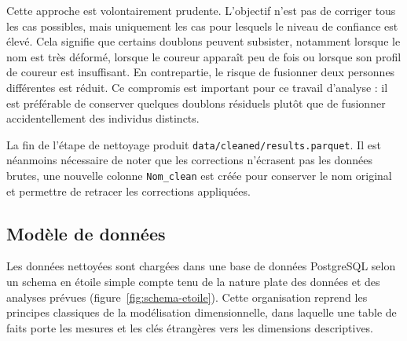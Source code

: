 \documentclass[12pt,a4paper]{article}
\begin{document}
Cette approche est volontairement prudente. L'objectif n'est pas de corriger tous les cas possibles, mais uniquement les cas pour lesquels le niveau de confiance est élevé. Cela signifie que certains doublons peuvent subsister, notamment lorsque le nom est très déformé, lorsque le coureur apparaît peu de fois ou lorsque son profil de coureur est insuffisant. En contrepartie, le risque de fusionner deux personnes différentes est réduit. Ce compromis est important pour ce travail d'analyse : il est préférable de conserver quelques doublons résiduels plutôt que de fusionner accidentellement des individus distincts.

La fin de l'étape de nettoyage produit \texttt{data/cleaned/results.parquet}. Il est néanmoins nécessaire de noter que les corrections n'écrasent pas les données brutes, une nouvelle colonne \texttt{Nom\_clean} est créée pour conserver le nom original et permettre de retracer les corrections appliquées.

\subsection{Modèle de données}

Les données nettoyées sont chargées dans une base de données PostgreSQL selon un schema en étoile simple compte tenu de la nature plate des données et des analyses prévues (figure~\ref{fig:schema-etoile}). Cette organisation reprend les principes classiques de la modélisation dimensionnelle, dans laquelle une table de faits porte les mesures et les clés étrangères vers les dimensions descriptives.
\end{document}
